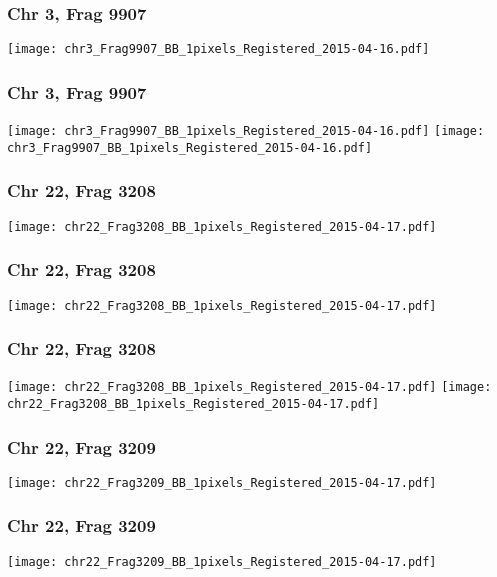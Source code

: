 \documentclass[10pt,dvipsnames,table]{beamer}
\begin{document}
\begin{frame}
\frametitle{Chr 3, Frag 9907}
\begin{center}
\texttt{[image: chr3\_Frag9907\_BB\_1pixels\_Registered\_2015-04-16.pdf]}
\end{center}
\end{frame}

\begin{frame}
\frametitle{Chr 3, Frag 9907}
\begin{center}
\texttt{[image: chr3\_Frag9907\_BB\_1pixels\_Registered\_2015-04-16.pdf]}
\texttt{[image: chr3\_Frag9907\_BB\_1pixels\_Registered\_2015-04-16.pdf]}
\end{center}
\end{frame}

\begin{frame}
\frametitle{Chr 22, Frag 3208}
\begin{center}
\texttt{[image: chr22\_Frag3208\_BB\_1pixels\_Registered\_2015-04-17.pdf]}
\end{center}
\end{frame}

\begin{frame}
\frametitle{Chr 22, Frag 3208}
\begin{center}
\texttt{[image: chr22\_Frag3208\_BB\_1pixels\_Registered\_2015-04-17.pdf]}
\end{center}
\end{frame}

\begin{frame}
\frametitle{Chr 22, Frag 3208}
\begin{center}
\texttt{[image: chr22\_Frag3208\_BB\_1pixels\_Registered\_2015-04-17.pdf]}
\texttt{[image: chr22\_Frag3208\_BB\_1pixels\_Registered\_2015-04-17.pdf]}
\end{center}
\end{frame}

\begin{frame}
\frametitle{Chr 22, Frag 3209}
\begin{center}
\texttt{[image: chr22\_Frag3209\_BB\_1pixels\_Registered\_2015-04-17.pdf]}
\end{center}
\end{frame}

\begin{frame}
\frametitle{Chr 22, Frag 3209}
\begin{center}
\texttt{[image: chr22\_Frag3209\_BB\_1pixels\_Registered\_2015-04-17.pdf]}
\end{center}
\end{frame}
\end{document}
